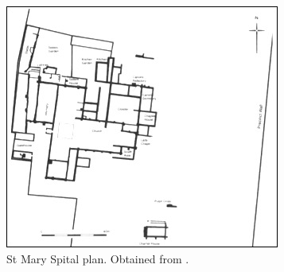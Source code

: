 \documentclass[%
	]{ijsra}
\begin{document}
	\begin{figure}
		\includegraphics[width=\linewidth]{figures/Pereda-Figure03}
		\caption{St Mary Spital plan. Obtained from \textcite[Figure 37][98]{Thomas_2002}.}
		\label{fig:Pereda-Figure03}
	\end{figure}
\end{document}
